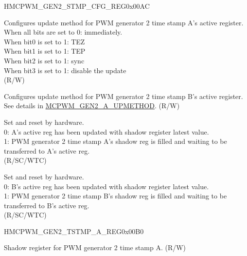 \begin{register}{H}{MCPWM\_GEN2\_STMP\_CFG\_REG}{0x00AC}\label{regdesc:MCPWMGEN2STMPCFGREG}
%
%
%
%
%
\regnewline%
\begin{regdesc}\begin{reglist}
\label{fielddesc:MCPWMGEN2AUPMETHOD}\item [MCPWM\_GEN2\_A\_UPMETHOD] Configures update method for PWM generator 2 time stamp A's active register. 
\\When all bits are set to 0: immediately. 
\\When bit0 is set to 1: TEZ 
\\When bit1 is set to 1: TEP 
\\When bit2 is set to 1: sync 
\\When bit3 is set to 1: disable the update 
\\(R/W)
\label{fielddesc:MCPWMGEN2BUPMETHOD}\item [MCPWM\_GEN2\_B\_UPMETHOD] Configures update method for PWM generator 2 time stamp B's active register. See details in \hyperref[fielddesc:MCPWMGEN2AUPMETHOD]{MCPWM\_GEN2\_A\_UPMETHOD}. (R/W)
\label{fielddesc:MCPWMGEN2ASHDWFULL}\item [MCPWM\_GEN2\_A\_SHDW\_FULL] Set and reset by hardware. \\
0: A's active reg has been updated with shadow register latest value. \\
1: PWM generator 2 time stamp A's shadow reg is filled and waiting to be transferred to A's active reg. 
\\(R/SC/WTC)
\label{fielddesc:MCPWMGEN2BSHDWFULL}\item [MCPWM\_GEN2\_B\_SHDW\_FULL] Set and reset by hardware. 
\\0: B's active reg has been updated with shadow register latest value.
\\1: PWM generator 2 time stamp B's shadow reg is filled and waiting to be transferred to B's active reg.
\\(R/SC/WTC)
\end{reglist}\end{regdesc}
\end{register}


\begin{register}{H}{MCPWM\_GEN2\_TSTMP\_A\_REG}{0x00B0}\label{regdesc:MCPWMGEN2TSTMPAREG}
%
%
\regnewline%
\begin{regdesc}\begin{reglist}
\label{fielddesc:MCPWMGEN2A}\item [MCPWM\_GEN2\_A] Shadow register for PWM generator 2 time stamp A. (R/W)
\end{reglist}\end{regdesc}
\end{register}


